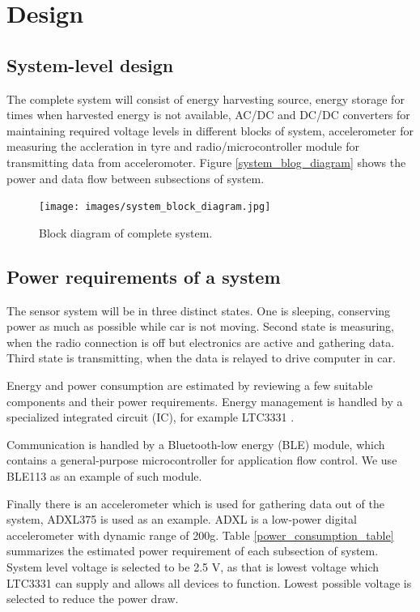 \section{Design}

\subsection{System-level design}
The complete system will consist of energy harvesting source, energy storage for times when harvested energy is not available, AC/DC and DC/DC converters for maintaining required voltage levels in different blocks of system, accelerometer for measuring the accleration in tyre and radio/microcontroller module for transmitting data from acceleromoter. Figure \ref{system_blog_diagram} shows the power and data flow between subsections of system. 


\begin{figure}[htb]
\begin{center}
\texttt{[image: images/system\_block\_diagram.jpg]}
\end{center}
\caption{\label{system_blog_diagram} Block diagram of complete system.}
\label{liitekuva}
\end{figure}


\subsection{Power requirements of a system}
The sensor system will be in three distinct states. One is sleeping, conserving power as much as possible while car is not moving.
Second state is measuring, when the radio connection is off but electronics are active and gathering data.
Third state is transmitting, when the data is relayed to drive computer in car.

Energy and power consumption are estimated by reviewing a few suitable components and their power requirements. 
Energy management is handled by a specialized integrated circuit (IC), for example LTC3331 \cite{Technology}.

Communication is handled by a Bluetooth-low energy (BLE) module, which contains a general-purpose microcontroller for application flow control.
We use BLE113 \cite{Bluegiga2013} as an example of such module.

Finally there is an accelerometer which is used for gathering data out of the system, ADXL375 \cite{ADXLDatasheet} is used as an example. ADXL is a low-power digital accelerometer with dynamic range of 200g. Table \ref{power_consumption_table}  summarizes the estimated power requirement of each subsection of system. System level voltage is selected to be 2.5 V, as that is lowest voltage which LTC3331 can supply and allows all devices to function. Lowest possible voltage is selected to reduce the power draw.

